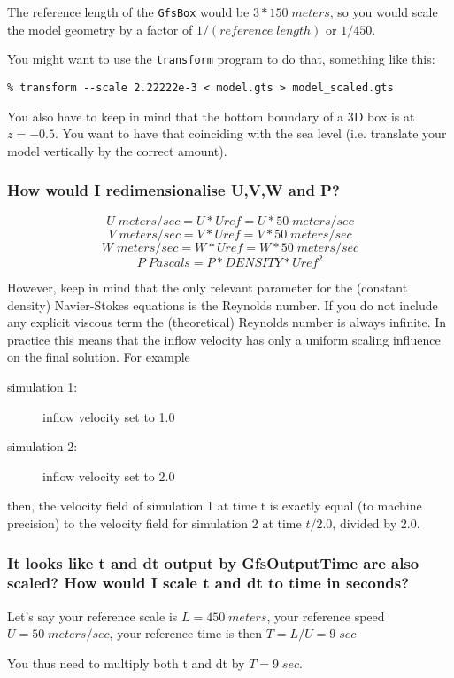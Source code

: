 \documentclass[a4paper]{article}
\begin{document}
The reference length of the {\tt GfsBox} would be $3*150\;meters$, so you would
scale the model geometry by a factor of $1/(reference\;length)$ or $1/450$.

You might want to use the {\tt transform} program to do
that, something like this:
\begin{verbatim}
% transform --scale 2.22222e-3 < model.gts > model_scaled.gts
\end{verbatim}

You also have to keep in mind that the bottom boundary of a 3D box is
at $z = -0.5$. You want to have that coinciding with the sea level
(i.e. translate your model vertically by the correct amount).

\subsubsection{How would I redimensionalise U,V,W and P?}

$$U\;meters/sec = U*Uref = U*50\;meters/sec$$
$$V\;meters/sec = V*Uref = V*50\;meters/sec$$
$$W\;meters/sec = W*Uref = W*50\;meters/sec$$
$$P\;Pascals = P*DENSITY*Uref^2$$

However, keep in mind that the only relevant parameter for the
(constant density) Navier-Stokes equations is the Reynolds number. If
you do not include any explicit viscous term the (theoretical)
Reynolds number is always infinite. In practice this means that the
inflow velocity has only a uniform scaling influence on the final
solution. For example
\begin{description}
\item[simulation 1:] inflow velocity set to 1.0
\item[simulation 2:] inflow velocity set to 2.0
\end{description}
then, the velocity field of simulation 1 at time t is exactly equal
(to machine precision) to the velocity field for simulation 2 at time
$t/2.0$, divided by 2.0.

\subsubsection{It looks like t and dt output by GfsOutputTime are also scaled?  How would I scale t and dt to time in seconds?}

Let's say your reference scale is $L=450\;meters$, your reference speed
$U=50\;meters/sec$, your reference time is then $T=L/U=9\;sec$

You thus need to multiply both t and dt by $T=9\;sec$.
\end{document}
